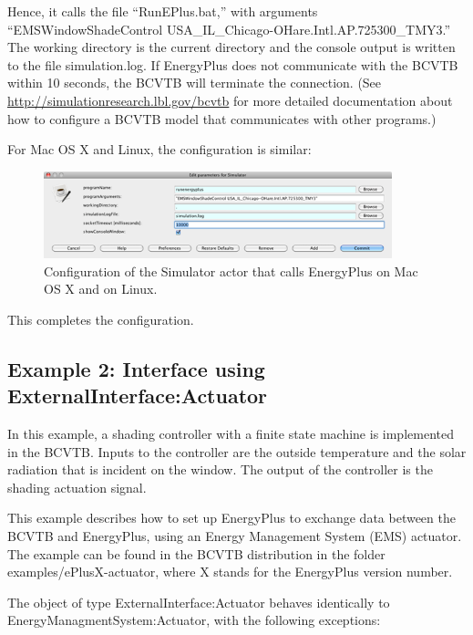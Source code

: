 Hence, it calls the file ``RunEPlus.bat,'' with arguments ``EMSWindowShadeControl USA\_IL\_Chicago-OHare.Intl.AP.725300\_TMY3.'' The working directory is the current directory and the console output is written to the file simulation.log. If EnergyPlus does not communicate with the BCVTB within 10 seconds, the BCVTB will terminate the connection. (See \url{http://simulationresearch.lbl.gov/bcvtb} for more detailed documentation about how to configure a BCVTB model that communicates with other programs.)

For Mac OS X and Linux, the configuration is similar:

\begin{figure}[hbtp] %
\centering
\includegraphics[width=0.9\textwidth, height=0.9\textheight, keepaspectratio=true]{media/image007.png}
\caption{Configuration of the Simulator actor that calls EnergyPlus on Mac OS X and on Linux. \protect \label{fig:configuration-of-the-simulator-actor-that-001}}
\end{figure}

This completes the configuration.

\subsection{Example 2: Interface using ExternalInterface:Actuator}\label{example-2-interface-using-externalinterfaceactuator}

In this example, a shading controller with a finite state machine is implemented in the BCVTB. Inputs to the controller are the outside temperature and the solar radiation that is incident on the window. The output of the controller is the shading actuation signal.

This example describes how to set up EnergyPlus to exchange data between the BCVTB and EnergyPlus, using an Energy Management System (EMS) actuator. The example can be found in the BCVTB distribution in the folder examples/ePlusX-actuator, where X stands for the EnergyPlus version number.

The object of type ExternalInterface:Actuator behaves identically to EnergyManagmentSystem:Actuator, with the following exceptions:

